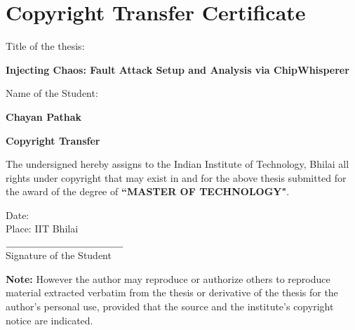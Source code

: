 \chapter*{Copyright Transfer Certificate}
\thispagestyle{myHeader}

\noindent
\begin{minipage}[c]{0.4\linewidth}
Title of the thesis: \\
\end{minipage} %
\begin{minipage}[c]{0.6\linewidth}
\textbf{Injecting Chaos: Fault Attack Setup
and Analysis via ChipWhisperer}\\
\end{minipage}
\vspace{1em}
\noindent
\begin{minipage}[c]{0.4\linewidth}
Name of the Student:
\end{minipage} %
\vspace{3em}
\begin{minipage}[c]{0.6\linewidth}
\textbf{Chayan Pathak}\\
\end{minipage}
\begin{center}
    \textbf{Copyright Transfer}
\end{center}
\vspace{1.5em}

The undersigned hereby assigns to the Indian Institute of Technology, Bhilai all rights under copyright that may exist in and for the above thesis submitted for the award of the degree of \textbf{``MASTER OF TECHNOLOGY"}.\\

\vspace{4em}
\noindent
\begin{minipage}[c]{0.7\linewidth}
Date: \\
Place: IIT Bhilai\\
\end{minipage} 
\begin{minipage}[c]{0.5\linewidth}
$\underline{\hspace{4.2cm}}$\\
Signature of the Student
\end{minipage}
\vspace{5em}

\textbf{Note:} However the author may reproduce or authorize others to reproduce material extracted verbatim from the thesis or derivative of the thesis for the author's personal use, provided that the source and the institute's copyright notice are indicated.